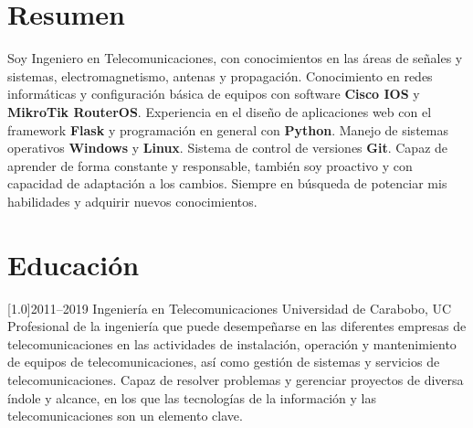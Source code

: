\documentclass[espanol]{cv-style}     %
\begin{document}
\section{Resumen}
  \vspace{-0.2cm}
Soy Ingeniero en Telecomunicaciones, con conocimientos en las áreas de señales y sistemas, electromagnetismo, antenas y propagación. Conocimiento en redes informáticas y configuración básica de equipos con software \textbf{Cisco IOS} y \textbf{MikroTik RouterOS}. Experiencia en el diseño de aplicaciones web con el framework \textbf{Flask} y programación en general con \textbf{Python}. Manejo de sistemas operativos \textbf{Windows} y \textbf{Linux}. Sistema de control de versiones \textbf{Git}. Capaz de aprender de forma constante y responsable, también soy proactivo y con capacidad de adaptación a los cambios. Siempre en búsqueda de potenciar mis habilidades y adquirir nuevos conocimientos.
\section{Educación}
  \vspace{-0.2cm}
\begin{entrylist}
\entry
{\scalebox{.8}[1.0]{2011--2019}}
{Ingeniería en Telecomunicaciones}
{Universidad de Carabobo, UC}
{\textbf{}
\\
\small{Profesional de la ingeniería que puede desempeñarse en las diferentes empresas de telecomunicaciones en las actividades de instalación, operación y mantenimiento de equipos de telecomunicaciones, así como gestión de sistemas y servicios de telecomunicaciones. Capaz de resolver problemas y gerenciar proyectos de diversa índole y alcance, en los que las tecnologías de la información y las telecomunicaciones son un elemento clave.}}
\end{entrylist}
\end{document}
